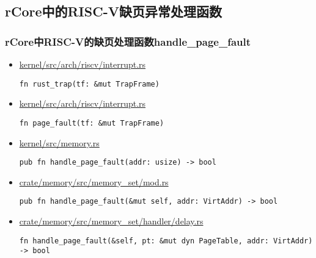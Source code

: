 \subsection{rCore中的RISC-V缺页异常处理函数}
\begin{frame}   
	\frametitle{rCore中RISC-V的缺页处理函数handle\_page\_fault}
    \begin{itemize}
        \item \href{https://github.com/rcore-os/rCore/blob/master/kernel/src/arch/riscv/interrupt.rs#L56}{kernel/src/arch/riscv/interrupt.rs}
\begin{verbatim}
fn rust_trap(tf: &mut TrapFrame)
\end{verbatim} \pause
        \item \href{https://github.com/rcore-os/rCore/blob/master/kernel/src/arch/riscv/interrupt.rs#L125}{kernel/src/arch/riscv/interrupt.rs}
\begin{verbatim}
fn page_fault(tf: &mut TrapFrame)
\end{verbatim} \pause
        \item \href{https://github.com/rcore-os/rCore/blob/master/kernel/src/memory.rs\#L132}{kernel/src/memory.rs}
\begin{verbatim}
pub fn handle_page_fault(addr: usize) -> bool
\end{verbatim} \pause
        \item \href{https://github.com/rcore-os/rCore/blob/master/crate/memory/src/memory_set/mod.rs#L379}{crate/memory/src/memory\_set/mod.rs}
\begin{verbatim}
pub fn handle_page_fault(&mut self, addr: VirtAddr) -> bool
\end{verbatim}
\pause
        \item \href{https://github.com/rcore-os/rCore/blob/master/crate/memory/src/memory_set/handler/delay.rs#L52}{crate/memory/src/memory\_set/handler/delay.rs}
\begin{verbatim}
fn handle_page_fault(&self, pt: &mut dyn PageTable, addr: VirtAddr) -> bool
\end{verbatim}
    \end{itemize}
\end{frame}
% 
% 
% 
% 
% 
